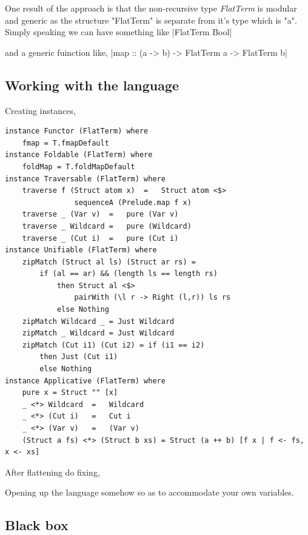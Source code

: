 \documentclass[proposal.tex]{subfiles}
\begin{document}
One result of the approach is that the non-recursive type \textit{FlatTerm} is modular and generic as the structure "FlatTerm" is separate 
from it's type which is "a". Simply speaking we can have something like 
|FlatTerm Bool|

and a generic fuinction like,
|map :: (a -> b) -> FlatTerm a -> FlatTerm b|


\subsection{Working with the language}
Creating instances,
\begin{verbatim}
instance Functor (FlatTerm) where
	fmap = T.fmapDefault
instance Foldable (FlatTerm) where
 	foldMap = T.foldMapDefault
instance Traversable (FlatTerm) where
  	traverse f (Struct atom x)	=	Struct atom <$> 
  				sequenceA (Prelude.map f x)
  	traverse _ (Var v)	=	pure (Var v)
  	traverse _ Wildcard	=	pure (Wildcard)
  	traverse _ (Cut i)	= 	pure (Cut i)
instance Unifiable (FlatTerm) where
	zipMatch (Struct al ls) (Struct ar rs) = 
		if (al == ar) && (length ls == length rs) 
			then Struct al <$> 
				pairWith (\l r -> Right (l,r)) ls rs  		
			else Nothing
	zipMatch Wildcard _ = Just Wildcard
	zipMatch _ Wildcard = Just Wildcard
	zipMatch (Cut i1) (Cut i2) = if (i1 == i2) 
		then Just (Cut i1) 
		else Nothing
instance Applicative (FlatTerm) where
	pure x = Struct "" [x] 
	_ <*> Wildcard	= 	Wildcard
	_ <*> (Cut i) 	= 	Cut i
	_ <*> (Var v)	=	(Var v)
	(Struct a fs) <*> (Struct b xs) = Struct (a ++ b) [f x | f <- fs, x <- xs] 
\end{verbatim}

After flattening do fixing,
 

Opening up the language somehow so as to accommodate your own variables.







\subsection{Black box}
\end{document}
